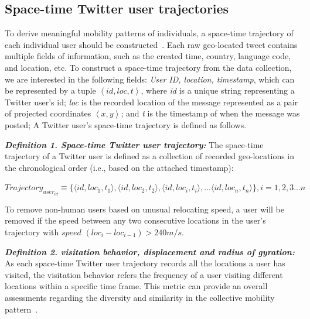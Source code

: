 \documentclass[a4paper, 11pt]{article}
\begin{document}
\subsection{Space-time Twitter user trajectories}
To derive meaningful mobility patterns of individuals, a space-time trajectory of each individual user should be constructed~\citep{hagerstrand1985time}.
Each raw geo-located tweet contains multiple fields of information, such as the created time, country, language code, and location, etc. To construct a space-time trajectory from the data collection, we are interested in the following fields: \textit{User ID, location, timestamp}, which can be represented by a tuple $\left\langle id, loc, t\right\rangle$, where \textit{id} is a unique string representing a Twitter user's id; \textit{loc} is the recorded location of the message represented as a pair of projected coordinates $\left\langle x, y\right\rangle$;
and \textit{t} is the timestamp of when the message was posted; A Twitter user's space-time trajectory is defined as follows.
\newline

\noindent\emph{\textbf{Definition 1. Space-time Twitter user trajectory:}} The space-time trajectory of a Twitter user is defined as a collection of recorded geo-locations in the chronological order (i.e., based on the attached timestamp):
\newline

$Trajectory_{user_{id}} \equiv \lbrace \langle id, loc_{1}, t_{1}\rangle, \langle id, loc_{2}, t_{2}\rangle, \langle id, loc_{i}, t_{i}\rangle, ... \langle id, loc_{n}, t_{n}\rangle \rbrace, i = 1, 2, 3...n$
\newline

To remove non-human users based on unusual relocating speed, a user will be removed if the speed between any two consecutive locations in the user's trajectory with $speed$ $(loc_{i} - loc_{i-1}) > 240 m/s $.
\newline

\noindent\emph{\textbf{Definition 2. visitation behavior, displacement and radius of gyration:}} As each space-time Twitter user trajectory records all the locations a user has visited, the visitation behavior refers the frequency of a user visiting different locations within a specific time frame.
This metric can provide an overall assessments regarding the diversity and similarity in the collective mobility pattern~\citep{gao2012exploring}.
\end{document}
